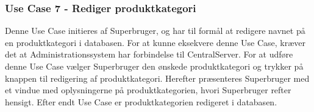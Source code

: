 \subsubsection{Use Case 7 - Rediger produktkategori}
Denne Use Case initieres af Superbruger, og har til formål at redigere navnet på en produktkategori i databasen. For at kunne eksekvere denne Use Case, kræver det at Administrationssystem har forbindelse til CentralServer. For at udføre denne Use Case vælger Superbruger den ønskede produktkategori og trykker på knappen til redigering af produktkategori. Herefter præsenteres Superbruger med et vindue med oplysningerne på produktkategorien, hvori Superbruger refter hensigt. Efter endt Use Case er produktkategorien redigeret i databasen.